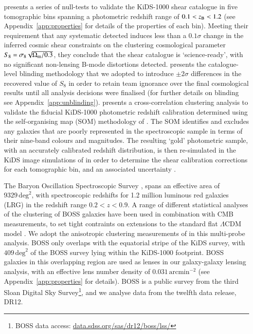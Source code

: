 \citet{giblin/etal:inprep} presents a series of null-tests to validate the KiDS-1000 shear catalogue in five tomographic bins spanning a 
photometric redshift range of $0.1 < z_{\rm B} < 1.2$ (see Appendix~\ref{app:properties} for details of the properties of each bin).  
Meeting their requirement that any systematic detected induces less than a $0.1\sigma$ change in the inferred 
cosmic shear constraints on the clustering cosmological parameter $S_8 = \sigma_8\sqrt{\Omega_{\rm m}/0.3}$, they conclude that the shear catalogue is `science-ready', with no significant non-lensing B-mode distortions detected.  \citet{kuijken/etal:2015} presents the catalogue-level blinding methodology that we adopted to introduce $\pm 2\sigma$ differences in the recovered value of $S_8$ in order
to retain team ignorance over the final cosmological results until all 
analysis decisions were finalised (for further details on blinding see Appendix~\ref{app:unblinding}).
\citet{hildebrandt/etal:inprep} presents a cross-correlation clustering analysis to validate the fiducial KiDS-1000 photometric redshift calibration determined using the self-organising map (SOM) methodology of \citet{wright/etal:2020}.   The SOM identifies and excludes any galaxies that are poorly represented in the spectroscopic sample in terms of their nine-band colours and magnitudes. The resulting `gold' photometric sample, with an accurately calibrated redshift distribution, is then re-simulated in the KiDS image simulations of \citet{kannawadi/etal:2019} in order to determine the shear calibration corrections for each tomographic bin, and an associated uncertainty \citep[see][for full details]{giblin/etal:inprep,hildebrandt/etal:inprep}.
 
The Baryon Oscillation Spectroscopic Survey
\citep[BOSS,][]{alam/etal:2015}, spans an effective area of $9329\,\mathrm{deg}^{2}$, with spectroscopic redshifts for 1.2 million luminous red
galaxies (LRG) in the redshift range $0.2<z<0.9$.   A range of
different statistical analyses of the clustering of BOSS galaxies have been used in combination with CMB
measurements, to set tight contraints on extensions to the standard
flat $\Lambda$CDM model \citep[see][and references
therein]{alam/etal:2017}.   We adopt the anisotropic clustering
measurements of \citet{sanchez/etal:2017} in this multi-probe analysis.
BOSS only overlaps with the equatorial stripe
of the KiDS survey, with $409\,\mathrm{deg}^{2}$ of the BOSS survey lying within
the KiDS-1000 footprint.  BOSS galaxies in this overlapping region are used as lenses in
our galaxy-galaxy lensing analysis, with an effective lens number density of $0.031\,\mathrm{arcmin}^{-2}$ (see Appendix~\ref{app:properties} for details).  BOSS is a public survey from the third Sloan
Digital Sky Survey\footnote{BOSS data access: \href{https://data.sdss.org/sas/dr12/boss/lss/}{data.sdss.org/sas/dr12/boss/lss/}}, and we analyse data from the twelfth data release, DR12. 

